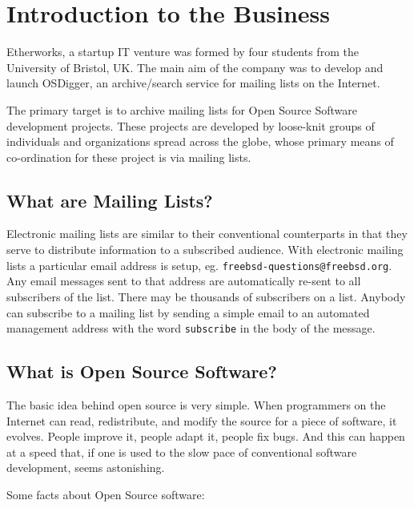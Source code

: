 
\section{Introduction to the Business}
Etherworks, a startup IT venture was formed by four students from the University of Bristol, UK.  The main aim of the company was to develop and launch OSDigger, an archive/search service for mailing lists on the Internet.

The primary target is to archive mailing lists for Open Source Software development projects.  These projects are developed by loose-knit groups of individuals and organizations spread across the globe, whose primary means of co-ordination for these project is via mailing lists.

\subsection{What are Mailing Lists?}
Electronic mailing lists are similar to their conventional counterparts
in that they serve to distribute information to a subscribed audience.
With electronic mailing lists a particular email address is setup, eg.
\texttt{freebsd-questions@freebsd.org}.  Any email messages sent to that
address are automatically re-sent to all subscribers of the list.  There
may be thousands of subscribers on a list.  Anybody can subscribe to a
mailing list by sending a simple email to an automated management address
with the word \texttt{subscribe} in the body of the message.

\subsection{What is Open Source Software?}
The basic idea behind open source is very simple. When programmers on the Internet can read, redistribute, and modify the source for a piece of software, it evolves. People improve it, people adapt it, people fix bugs. And this can happen at a speed that, if one is used to the slow pace of conventional software development, seems astonishing.

Some facts about Open Source software:



